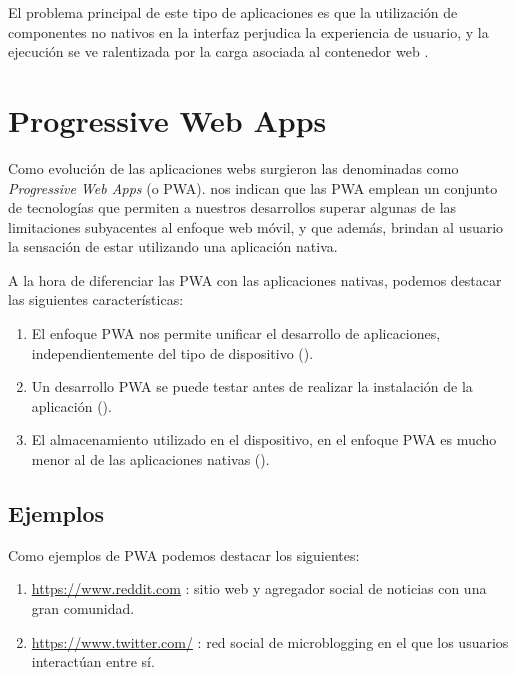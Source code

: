 \documentclass{\ClassPath/viu-tfm-template}
\begin{document}
El problema principal de este tipo de aplicaciones es que la utilización de componentes no nativos en la interfaz perjudica la experiencia de usuario, y la ejecución se ve ralentizada por la carga asociada al contenedor web \parencite{thomas_2020}.

\chapter{Progressive Web Apps}

Como evolución de las aplicaciones webs surgieron las denominadas como \textit{Progressive Web Apps} (o PWA). \textcite{aguirre2019pwa} nos indican que las PWA emplean un conjunto de tecnologías que permiten a nuestros desarrollos superar algunas de las limitaciones subyacentes al enfoque web móvil, y que además, brindan al usuario la sensación de estar utilizando una aplicación nativa.

A la hora de diferenciar las PWA con las aplicaciones nativas, podemos destacar las siguientes características:
\vspace{-1.2em}
\begin{enumerate}
    \item El enfoque PWA nos permite unificar el desarrollo de aplicaciones, independientemente del tipo de dispositivo (\cite{aguirre2019pwa}).
    \item Un desarrollo PWA se puede testar antes de realizar la instalación de la aplicación (\cite{webist17}).
    \item El almacenamiento utilizado en el dispositivo, en el enfoque PWA es mucho menor al de las aplicaciones nativas (\cite{webist17}).
\end{enumerate}
\vspace{-1.2em}

\section{Ejemplos}

Como ejemplos de PWA podemos destacar los siguientes:
\vspace{-1.2em}
\begin{enumerate}
    \item \href{https://www.reddit.com/}{https://www.reddit.com} : sitio web y agregador social de noticias con una gran comunidad.
    \item \href{https://www.twitter.com/}{https://www.twitter.com/} : red social de microblogging en el que los usuarios interactúan entre sí.
\end{enumerate}
\vspace{-1.2em}
\end{document}
